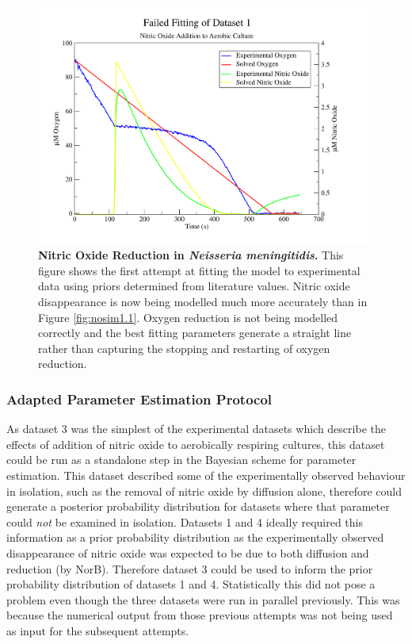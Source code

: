 \begin{figure}[tbp]
 \centering
 \includegraphics[width=15cm, trim=1cm 1cm 3cm 1cm, clip=true]{./06-noreduction/data/aer-no-sim3.pdf}
 \caption[{Nitric Oxide Reduction in \textit{Neisseria meningitidis}.}]{{\bf Nitric Oxide Reduction in \textit{Neisseria meningitidis}.} This figure shows the first attempt at fitting the model to experimental data using priors determined from literature values. Nitric oxide disappearance is now being modelled much more accurately than in Figure \ref{fig:nosim1.1}. Oxygen reduction is not being modelled correctly and the best fitting parameters generate a straight line rather than capturing the stopping and restarting of oxygen reduction.}
 \label{fig:nosim3.1}
\end{figure}

\subsubsection{Adapted Parameter Estimation Protocol}

As dataset 3 was the simplest of the experimental datasets which describe the effects of addition of nitric oxide to aerobically respiring cultures, this dataset could be run as a standalone step in the Bayesian scheme for parameter estimation. This dataset described some of the experimentally observed behaviour in isolation, such as the removal of nitric oxide by diffusion alone, therefore could generate a posterior probability distribution for datasets where that parameter could \textit{not} be examined in isolation. Datasets 1 and 4 ideally required this information as a prior probability distribution as the experimentally observed disappearance of nitric oxide was expected to be due to both diffusion and reduction (by NorB). Therefore dataset 3 could be used to inform the prior probability distribution of datasets 1 and 4. Statistically this did not pose a problem even though the three datasets were run in parallel previously. This was because the numerical output from those previous attempts was not being used as input for the subsequent attempts.

